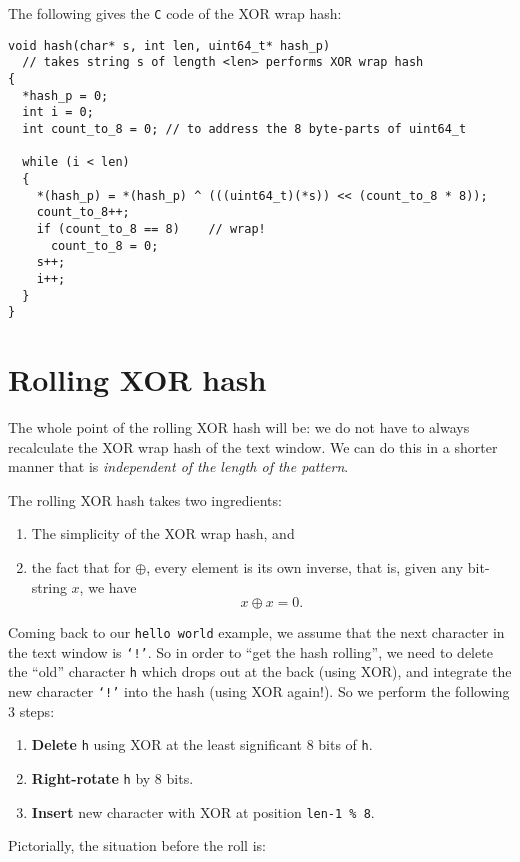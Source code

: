 \documentclass[11pt, a4paper]{amsart}
\begin{document}
The following gives the {\tt C} code of the XOR wrap hash:
\begin{verbatim}
void hash(char* s, int len, uint64_t* hash_p)
  // takes string s of length <len> performs XOR wrap hash
{
  *hash_p = 0;
  int i = 0;
  int count_to_8 = 0; // to address the 8 byte-parts of uint64_t

  while (i < len)
  {
    *(hash_p) = *(hash_p) ^ (((uint64_t)(*s)) << (count_to_8 * 8));
    count_to_8++; 
    if (count_to_8 == 8)    // wrap!
      count_to_8 = 0;
    s++;
    i++;
  }
}
\end{verbatim}
\section{Rolling XOR hash}
The whole point of the rolling XOR hash will be: we do not have
to always recalculate the XOR wrap hash of the text window. We 
can do this in a shorter manner that is {\em  
independent of the length of the pattern}.

The rolling XOR hash takes two ingredients:
\begin{enumerate}
    \item The simplicity of the XOR wrap hash, and 
    \item the fact that for $\oplus$, every element is its own inverse,
    that is, given  any bit-string $x$, we have $$x \oplus x = 0.$$
\end{enumerate}
Coming back to our {\tt hello world} example, we assume that 
the next character in the text window is {\tt `!'}. So
in order to ``get the hash rolling'', we need to delete the ``old''
character {\tt h} which drops out at the back (using XOR), and integrate
the new character {\tt `!'} into the hash (using XOR again!). 
So we perform the following  3 steps:
\begin{enumerate}
    \item {\bf Delete} {\tt h} using XOR at the least significant 8 bits of 
    {\tt h}.
    \item {\bf Right-rotate} {\tt h} by 8 bits. 
    \item {\bf Insert} new character with XOR at position {\tt len-1 \% 8}.
\end{enumerate}
Pictorially, the situation before the roll is:
\end{document}
